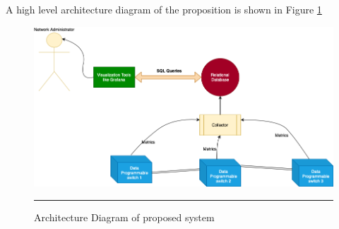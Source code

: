 A high level architecture diagram of the proposition is shown in Figure \ref{fig:Architecture Diagram}

\begin{figure}[htbp]
	\centering
		\includegraphics[width=1.0\columnwidth]{Figures/ArchitectureDiagram.png}
		\rule{35em}{0.5pt}
	\caption[Architecture Diagram]{Architecture Diagram of proposed system}
	\label{fig:Architecture Diagram}
\end{figure}